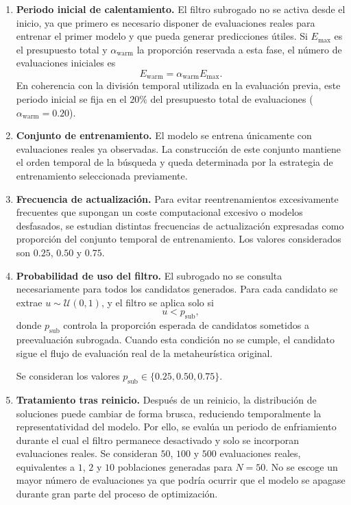 \begin{enumerate}
    \item \textbf{Periodo inicial de calentamiento.} El filtro subrogado no se activa desde el inicio, ya que primero es necesario disponer de evaluaciones reales para entrenar el primer modelo y que pueda generar predicciones útiles. Si \(E_{\max}\) es el presupuesto total y \(\alpha_{\text{warm}}\) la proporción reservada a esta fase, el número de evaluaciones iniciales es
          \[
              E_{\text{warm}} = \alpha_{\text{warm}} E_{\max}.
          \]
          En coherencia con la división temporal utilizada en la evaluación previa, este periodo inicial se fija en el \(20\%\) del presupuesto total de evaluaciones (\(\alpha_{\text{warm}}=0.20\)).

    \item \textbf{Conjunto de entrenamiento.} El modelo se entrena únicamente con evaluaciones reales ya
          observadas. La construcción de este conjunto mantiene el orden temporal
          de la búsqueda y queda determinada por la estrategia de entrenamiento
          seleccionada previamente.

    \item \textbf{Frecuencia de actualización.} Para evitar reentrenamientos
          excesivamente frecuentes que supongan un coste computacional excesivo o modelos desfasados, se estudian distintas
          frecuencias de actualización expresadas como proporción del conjunto
          temporal de entrenamiento. Los valores considerados son \(0.25\),
          \(0.50\) y \(0.75\).

    \item \textbf{Probabilidad de uso del filtro.} El subrogado no se consulta necesariamente para todos los candidatos generados. Para cada candidato se extrae \(u \sim \mathcal{U}(0,1)\), y el filtro se aplica solo si
          \[
              u < p_{\text{sub}},
          \]
          donde \(p_{\text{sub}}\) controla la proporción esperada de candidatos sometidos a preevaluación subrogada. Cuando esta condición no se cumple, el candidato sigue el flujo de evaluación real de la metaheurística original.

          Se consideran los valores \(p_{\text{sub}} \in \{0.25, 0.50,
          0.75\}\).

    \item \textbf{Tratamiento tras reinicio.} Después de un reinicio, la
          distribución de soluciones puede cambiar de forma brusca, reduciendo
          temporalmente la representatividad del modelo. Por ello, se evalúa un periodo de enfriamiento durante el cual el filtro permanece desactivado y solo se incorporan evaluaciones reales. Se
          consideran \(50\), \(100\) y \(500\) evaluaciones reales,
          equivalentes a \(1\), \(2\) y \(10\) poblaciones generadas para
          \(N=50\). No se escoge un mayor número de evaluaciones ya que podría ocurrir que el modelo se apagase durante gran parte del proceso de optimización.
\end{enumerate}

